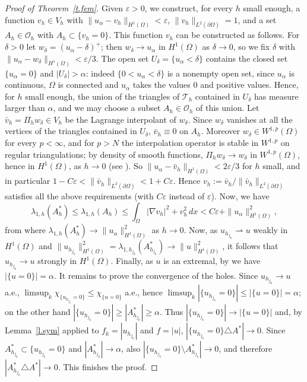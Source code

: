 \documentclass[11pt]{amsart}
\theoremstyle{remark}
\numberwithin{equation}{section}
\begin{document}
\begin{proof}[Proof of Theorem~\ref{t.fem}]
Given $\varepsilon>0$, we construct, for every $h$ small enough, a function $v_h\in V_h$ with $\|u_\alpha-v_h\|_{H^1(\Omega)}<\varepsilon$, $\|v_h\|_{L^2(\partial\Omega)}=1$, and a set $A_h\in\mathcal{O}_h$ with $A_h\subset\{v_h=0\}$. This function $v_h$ can be constructed as follows. For $\delta>0$ let $w_\delta=(u_\alpha-\delta)^+$; then $w_\delta\to u_\alpha$ in $H^1(\Omega)$ as $\delta\to0$, so we fix $\delta$ with $\|u_\alpha-w_\delta\|_{H^1(\Omega)}<\varepsilon/3$. The open set $U_\delta=\{u_\alpha<\delta\}$ contains the closed set $\{u_\alpha=0\}$ and $|U_\delta|>\alpha$: indeed $\{0<u_\alpha<\delta\}$ is a nonempty open set, since $u_\alpha$ is continuous, $\Omega$ is connected and $u_\alpha$ takes the values $0$ and positive values. Hence, for $h$ small enough, the union of the triangles of $\mathcal{T}_h$ contained in $U_\delta$ has measure larger than $\alpha$, and we may choose a subset $A_h\in\mathcal{O}_h$ of this union. Let $\bar v_h=\Pi_hw_\delta\in V_h$ be the Lagrange interpolant of $w_\delta$. Since $w_\delta$ vanishes at all the vertices of the triangles contained in $U_\delta$, $\bar v_h\equiv0$ on $A_h$. Moreover $w_\delta\in W^{1,p}(\Omega)$ for every $p<\infty$, and for $p>N$ the interpolation operator is stable in $W^{1,p}$ on regular triangulations; by density of smooth functions, $\Pi_hw_\delta\to w_\delta$ in $W^{1,p}(\Omega)$, hence in $H^1(\Omega)$, as $h\to0$ (see \cite{Ci}). So $\|u_\alpha-\bar v_h\|_{H^1(\Omega)}<2\varepsilon/3$ for $h$ small, and in particular $1-C\varepsilon<\|\bar v_h\|_{L^2(\partial\Omega)}<1+C\varepsilon$. Hence $v_h:=\bar v_h/\|\bar v_h\|_{L^2(\partial\Omega)}$ satisfies all the above requirements (with $C\varepsilon$ instead of $\varepsilon$). Now, we have
\[
\lambda_{1,h}(A^*_h)\le\lambda_{1,h}(A_h)\le\int_\Omega|\nabla v_h|^2+v_h^2\,dx<C\varepsilon+\|u_\alpha\|^2_{H^1(\Omega)},
\]
from where $\lambda_{1,h}(A^*_h)\to\|u_\alpha\|^2_{H^1(\Omega)}$ as $h\to0$. Now, as $u_{h_{j_k}}\rightharpoonup u$ weakly in $H^1(\Omega)$ and $\|u_{h_{j_k}}\|^2_{H^1(\Omega)}=\lambda_{1,h_{j_k}}(A^*_{h_{j_k}})\to\|u\|^2_{H^1(\Omega)}$, it follows that $u_{h_{j_k}}\to u$ strongly in $H^1(\Omega)$. Finally, as $u$ is an extremal, by \cite{FBRW1} we have $|\{u=0\}|=\alpha$. It remains to prove the convergence of the holes. Since $u_{h_{j_k}}\to u$ a.e., $\limsup_k\chi_{\{u_{h_{j_k}}=0\}}\le\chi_{\{u=0\}}$ a.e., hence $\limsup_k|\{u_{h_{j_k}}=0\}|\le|\{u=0\}|=\alpha$; on the other hand $|\{u_{h_{j_k}}=0\}|\ge|A^*_{h_{j_k}}|\ge\alpha$. Thus $|\{u_{h_{j_k}}=0\}|\to|\{u=0\}|$ and, by Lemma~\ref{l.sym} applied to $f_k=|u_{h_{j_k}}|$ and $f=|u|$, $|\{u_{h_{j_k}}=0\}\triangle A^*|\to0$. Since $A^*_{h_{j_k}}\subset\{u_{h_{j_k}}=0\}$ and $|A^*_{h_{j_k}}|\to\alpha$, also $|\{u_{h_{j_k}}=0\}\setminus A^*_{h_{j_k}}|\to0$, and therefore $|A^*_{h_{j_k}}\triangle A^*|\to0$. This finishes the proof.
\end{proof}
\end{document}
